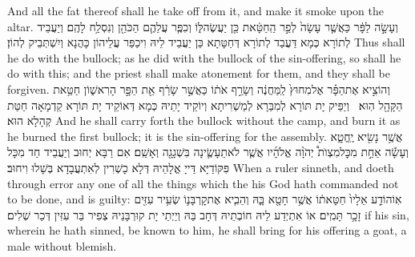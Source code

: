 {And all the fat thereof shall he take off from it, and make it smoke upon the altar.}{}
{וְעָשָׂ֣ה לַפָּ֔ר כַּאֲשֶׁ֤ר עָשָׂה֙ לְפַ֣ר הַֽחַטָּ֔את כֵּ֖ן יַעֲשֶׂה\maqqaf לּ֑וֹ וְכִפֶּ֧ר עֲלֵהֶ֛ם הַכֹּהֵ֖ן וְנִסְלַ֥ח לָהֶֽם׃}
{וְיַעֲבֵיד לְתוֹרָא כְּמָא דַּעֲבַד לְתוֹרָא דְּחַטָּתָא כֵּן יַעֲבֵיד לֵיהּ וִיכַפַּר עֲלֵיהוֹן כָּהֲנָא וְיִשְׁתְּבֵיק לְהוֹן׃}
{Thus shall he do with the bullock; as he did with the bullock of the sin-offering, so shall he do with this; and the priest shall make atonement for them, and they shall be forgiven.}{}
{וְהוֹצִ֣יא אֶת\maqqaf הַפָּ֗ר אֶל\maqqaf מִחוּץ֙ לַֽמַּחֲנֶ֔ה וְשָׂרַ֣ף אֹת֔וֹ כַּאֲשֶׁ֣ר שָׂרַ֔ף אֵ֖ת הַפָּ֣ר הָרִאשׁ֑וֹן חַטַּ֥את הַקָּהָ֖ל הֽוּא׃ \petucha }
{וְיַפֵּיק יָת תּוֹרָא לְמִבַּרָא לְמַשְׁרִיתָא וְיוֹקֵיד יָתֵיהּ כְּמָא דְּאוֹקֵיד יָת תּוֹרָא קַדְמָאָה חַטַּת קְהָלָא הוּא׃}
{And he shall carry forth the bullock without the camp, and burn it as he burned the first bullock; it is the sin-offering for the assembly.}{}
{אֲשֶׁ֥ר נָשִׂ֖יא יֶֽחֱטָ֑א וְעָשָׂ֡ה אַחַ֣ת מִכׇּל\maqqaf מִצְוֺת֩ יְהֹוָ֨ה אֱלֹהָ֜יו אֲשֶׁ֧ר לֹא\maqqaf תֵעָשֶׂ֛ינָה בִּשְׁגָגָ֖ה וְאָשֵֽׁם׃}
{אִם רַבָּא יְחוּב וְיַעֲבֵיד חַד מִכָּל פִּקּוֹדַיָּא דַּייָ אֱלָהֵיהּ דְּלָא כָשְׁרִין לְאִתְעֲבָדָא בְּשָׁלוּ וִיחוּב׃}
{When a ruler sinneth, and doeth through error any one of all the things which the \lord\space his God hath commanded not to be done, and is guilty:}{}
{אֽוֹ\maqqaf הוֹדַ֤ע אֵלָיו֙ חַטָּאת֔וֹ אֲשֶׁ֥ר חָטָ֖א בָּ֑הּ וְהֵבִ֧יא אֶת\maqqaf קׇרְבָּנ֛וֹ שְׂעִ֥יר עִזִּ֖ים זָכָ֥ר תָּמִֽים׃}
{אוֹ אִתְיְדַע לֵיהּ חוֹבְתֵיהּ דְּחָב בַּהּ וְיַיְתֵי יָת קוּרְבָּנֵיהּ צְפִיר בַּר עִזִּין דְּכַר שְׁלִים׃}
{if his sin, wherein he hath sinned, be known to him, he shall bring for his offering a goat, a male without blemish.}{}
